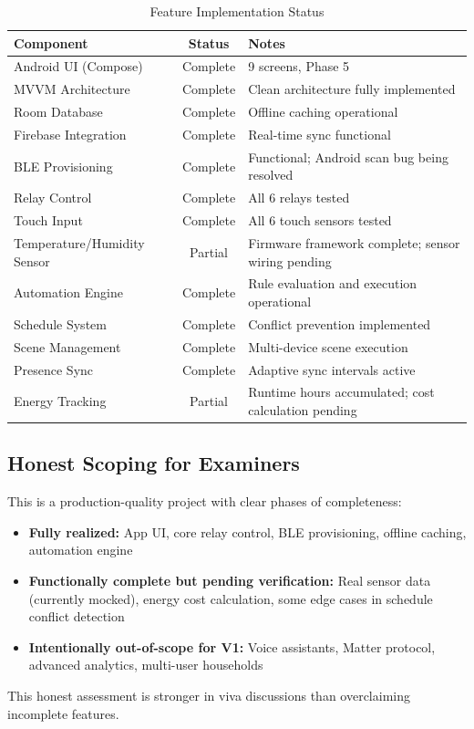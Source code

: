 \begin{table}[H]
\centering
\caption{Feature Implementation Status}
\label{tbl:implementation_status}
\begin{tabular}{|l|c|p{7.5cm}|}
\hline
\textbf{Component} & \textbf{Status} & \textbf{Notes} \\
\hline
Android UI (Compose) & Complete & 9 screens, Phase 5 \\
\hline
MVVM Architecture & Complete & Clean architecture fully implemented \\
\hline
Room Database & Complete & Offline caching operational \\
\hline
Firebase Integration & Complete & Real-time sync functional \\
\hline
BLE Provisioning & Complete & Functional; Android scan bug being resolved \\
\hline
Relay Control & Complete & All 6 relays tested \\
\hline
Touch Input & Complete & All 6 touch sensors tested \\
\hline
Temperature/Humidity Sensor & Partial & Firmware framework complete; sensor wiring pending \\
\hline
Automation Engine & Complete & Rule evaluation and execution operational \\
\hline
Schedule System & Complete & Conflict prevention implemented \\
\hline
Scene Management & Complete & Multi-device scene execution \\
\hline
Presence Sync & Complete & Adaptive sync intervals active \\
\hline
Energy Tracking & Partial & Runtime hours accumulated; cost calculation pending \\
\hline
\end{tabular}
\end{table}

\subsection{Honest Scoping for Examiners}

This is a production-quality project with clear phases of completeness:

\begin{itemize}
    \item \textbf{Fully realized:} App UI, core relay control, BLE provisioning, offline caching, automation engine
    \item \textbf{Functionally complete but pending verification:} Real sensor data (currently mocked), energy cost calculation, some edge cases in schedule conflict detection
    \item \textbf{Intentionally out-of-scope for V1:} Voice assistants, Matter protocol, advanced analytics, multi-user households
\end{itemize}

This honest assessment is stronger in viva discussions than overclaiming incomplete features.
